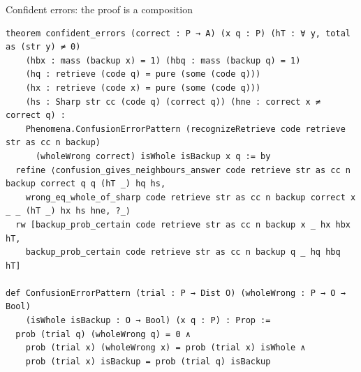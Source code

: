 \documentclass[aspectratio=169,11pt]{beamer}
\begin{document}
\begin{frame}[fragile]{Confident errors: the proof is a composition}
\begin{Verbatim}
theorem confident_errors (correct : P → A) (x q : P) (hT : ∀ y, total as (str y) ≠ 0)
    (hbx : mass (backup x) = 1) (hbq : mass (backup q) = 1)
    (hq : retrieve (code q) = pure (some (code q)))
    (hx : retrieve (code x) = pure (some (code q)))
    (hs : Sharp str cc (code q) (correct q)) (hne : correct x ≠ correct q) :
    Phenomena.ConfusionErrorPattern (recognizeRetrieve code retrieve str as cc n backup)
      (wholeWrong correct) isWhole isBackup x q := by
  refine ⟨confusion_gives_neighbours_answer code retrieve str as cc n backup correct q q (hT _) hq hs,
    wrong_eq_whole_of_sharp code retrieve str as cc n backup correct x _ _ (hT _) hx hs hne, ?_⟩
  rw [backup_prob_certain code retrieve str as cc n backup x _ hx hbx hT,
    backup_prob_certain code retrieve str as cc n backup q _ hq hbq hT]

def ConfusionErrorPattern (trial : P → Dist O) (wholeWrong : P → O → Bool)
    (isWhole isBackup : O → Bool) (x q : P) : Prop :=
  prob (trial q) (wholeWrong q) = 0 ∧
    prob (trial x) (wholeWrong x) = prob (trial x) isWhole ∧
    prob (trial x) isBackup = prob (trial q) isBackup
\end{Verbatim}
\end{frame}
\end{document}
